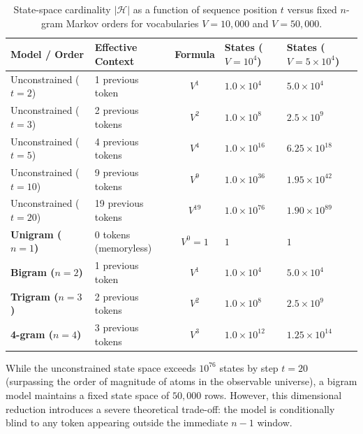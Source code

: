 \documentclass[../../main.tex]{subfiles}
\begin{document}
\begin{table}[htbp]
\centering
\small
\caption{State-space cardinality $|\mathcal{H}|$ as a function of sequence position $t$ versus fixed $n$-gram Markov orders for vocabularies $V = 10{,}000$ and $V = 50{,}000$.}
\label{tab:state_space_reduction}
\begin{tabularx}{\textwidth}{l l c >{\raggedleft\arraybackslash}X >{\raggedleft\arraybackslash}X}
\toprule
\textbf{Model / Order} & \textbf{Effective Context} & \textbf{Formula} & \textbf{States ($V = 10^4$)} & \textbf{States ($V = 5 \times 10^4$)} \\
\midrule
Unconstrained ($t=2$)  & 1 previous token   & $V^1$       & $1.0 \times 10^4$    & $5.0 \times 10^4$    \\
Unconstrained ($t=3$)  & 2 previous tokens  & $V^2$       & $1.0 \times 10^8$    & $2.5 \times 10^9$    \\
Unconstrained ($t=5$)  & 4 previous tokens  & $V^4$       & $1.0 \times 10^{16}$ & $6.25 \times 10^{18}$ \\
Unconstrained ($t=10$) & 9 previous tokens  & $V^9$       & $1.0 \times 10^{36}$ & $1.95 \times 10^{42}$ \\
Unconstrained ($t=20$) & 19 previous tokens & $V^{19}$     & $1.0 \times 10^{76}$ & $1.90 \times 10^{89}$ \\
\midrule
\textbf{Unigram ($n=1$)} & 0 tokens (memoryless) & $V^0 = 1$   & $1$                  & $1$                  \\
\textbf{Bigram ($n=2$)}  & 1 previous token      & $V^1$       & $1.0 \times 10^4$    & $5.0 \times 10^4$    \\
\textbf{Trigram ($n=3$)} & 2 previous tokens     & $V^2$       & $1.0 \times 10^8$    & $2.5 \times 10^9$    \\
\textbf{4-gram ($n=4$)}  & 3 previous tokens     & $V^3$       & $1.0 \times 10^{12}$ & $1.25 \times 10^{14}$ \\
\bottomrule
\end{tabularx}
\end{table}

While the unconstrained state space exceeds $10^{76}$ states by step $t=20$ (surpassing the order of magnitude of atoms in the observable universe), a bigram model maintains a fixed state space of $50{,}000$ rows. However, this dimensional reduction introduces a severe theoretical trade-off: the model is conditionally blind to any token appearing outside the immediate $n-1$ window.
\end{document}
